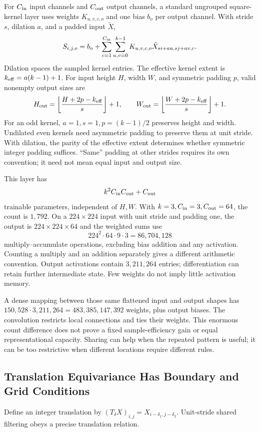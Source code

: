 For $C_{\rm in}$ input channels and $C_{\rm out}$ output channels, a standard ungrouped square-kernel layer uses weights $K_{u,v,c,o}$ and one bias $b_o$ per output channel. With stride $s$, dilation $a$, and a padded input $\tilde X$,
\[
S_{i,j,o}=b_o+\sum_{c=1}^{C_{\rm in}}\sum_{u,v=0}^{k-1}
K_{u,v,c,o}\tilde X_{si+au,sj+av,c}.
\]
Dilation spaces the sampled kernel entries. The effective kernel extent is $k_{\rm eff}=a(k-1)+1$. For input height $H$, width $W$, and symmetric padding $p$, valid nonempty output sizes are
\[
H_{\rm out}=\left\lfloor\frac{H+2p-k_{\rm eff}}s\right\rfloor+1,
\qquad
W_{\rm out}=\left\lfloor\frac{W+2p-k_{\rm eff}}s\right\rfloor+1.
\]
For an odd kernel, $a=1,s=1,p=(k-1)/2$ preserves height and width. Undilated even kernels need asymmetric padding to preserve them at unit stride. With dilation, the parity of the effective extent determines whether symmetric integer padding suffices. ``Same'' padding at other strides requires its own convention; it need not mean equal input and output size.

This layer has
\[
k^2C_{\rm in}C_{\rm out}+C_{\rm out}
\]
trainable parameters, independent of $H,W$. With $k=3,C_{\rm in}=3,C_{\rm out}=64$, the count is $1{,}792$. On a $224\times224$ input with unit stride and padding one, the output is $224\times224\times64$ and the weighted sums use
\[
224^2\cdot64\cdot9\cdot3=86{,}704{,}128
\]
multiply--accumulate operations, excluding bias addition and any activation. Counting a multiply and an addition separately gives a different arithmetic convention. Output activations contain $3{,}211{,}264$ entries; differentiation can retain further intermediate state. Few weights do not imply little activation memory.

A dense mapping between those same flattened input and output shapes has $150{,}528\cdot3{,}211{,}264=483{,}385{,}147{,}392$ weights, plus output biases. The convolution restricts local connections and ties their weights. This enormous count difference does not prove a fixed sample-efficiency gain or equal representational capacity. Sharing can help when the repeated pattern is useful; it can be too restrictive when different locations require different rules.

\subsection{Translation Equivariance Has Boundary and Grid Conditions}

Define an integer translation by $(T_\delta X)_{i,j}=X_{i-\delta_1,j-\delta_2}$. Unit-stride shared filtering obeys a precise translation relation.


